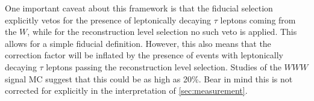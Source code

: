 One important caveat about this framework is that the fiducial selection explicitly vetos for the presence of leptonically decaying $\tau$ leptons coming from the $W$, 
while for the reconstruction level selection no such veto is applied. 
This allows for a simple fiducial definition.
However, this also means that the correction factor will be inflated by the presence of 
events with leptonically decaying $\tau$ leptons passing the reconstruction
level selection. Studies of the $WWW$ signal MC suggest that this could be 
as high as 20\%. Bear in mind this is not corrected for explicitly in the interpretation
of \sec\ref{sec:measurement}.

